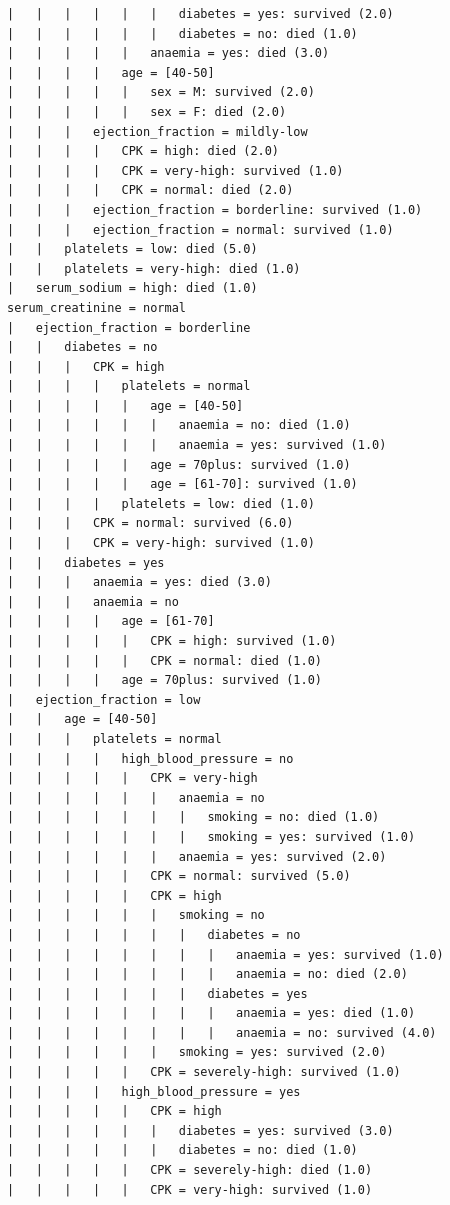 \documentclass[12pt,a4paper]{article}
\begin{document}
{\begin{verbatim}
|   |   |   |   |   |   diabetes = yes: survived (2.0)
|   |   |   |   |   |   diabetes = no: died (1.0)
|   |   |   |   |   anaemia = yes: died (3.0)
|   |   |   |   age = [40-50]
|   |   |   |   |   sex = M: survived (2.0)
|   |   |   |   |   sex = F: died (2.0)
|   |   |   ejection_fraction = mildly-low
|   |   |   |   CPK = high: died (2.0)
|   |   |   |   CPK = very-high: survived (1.0)
|   |   |   |   CPK = normal: died (2.0)
|   |   |   ejection_fraction = borderline: survived (1.0)
|   |   |   ejection_fraction = normal: survived (1.0)
|   |   platelets = low: died (5.0)
|   |   platelets = very-high: died (1.0)
|   serum_sodium = high: died (1.0)
serum_creatinine = normal
|   ejection_fraction = borderline
|   |   diabetes = no
|   |   |   CPK = high
|   |   |   |   platelets = normal
|   |   |   |   |   age = [40-50]
|   |   |   |   |   |   anaemia = no: died (1.0)
|   |   |   |   |   |   anaemia = yes: survived (1.0)
|   |   |   |   |   age = 70plus: survived (1.0)
|   |   |   |   |   age = [61-70]: survived (1.0)
|   |   |   |   platelets = low: died (1.0)
|   |   |   CPK = normal: survived (6.0)
|   |   |   CPK = very-high: survived (1.0)
|   |   diabetes = yes
|   |   |   anaemia = yes: died (3.0)
|   |   |   anaemia = no
|   |   |   |   age = [61-70]
|   |   |   |   |   CPK = high: survived (1.0)
|   |   |   |   |   CPK = normal: died (1.0)
|   |   |   |   age = 70plus: survived (1.0)
|   ejection_fraction = low
|   |   age = [40-50]
|   |   |   platelets = normal
|   |   |   |   high_blood_pressure = no
|   |   |   |   |   CPK = very-high
|   |   |   |   |   |   anaemia = no
|   |   |   |   |   |   |   smoking = no: died (1.0)
|   |   |   |   |   |   |   smoking = yes: survived (1.0)
|   |   |   |   |   |   anaemia = yes: survived (2.0)
|   |   |   |   |   CPK = normal: survived (5.0)
|   |   |   |   |   CPK = high
|   |   |   |   |   |   smoking = no
|   |   |   |   |   |   |   diabetes = no
|   |   |   |   |   |   |   |   anaemia = yes: survived (1.0)
|   |   |   |   |   |   |   |   anaemia = no: died (2.0)
|   |   |   |   |   |   |   diabetes = yes
|   |   |   |   |   |   |   |   anaemia = yes: died (1.0)
|   |   |   |   |   |   |   |   anaemia = no: survived (4.0)
|   |   |   |   |   |   smoking = yes: survived (2.0)
|   |   |   |   |   CPK = severely-high: survived (1.0)
|   |   |   |   high_blood_pressure = yes
|   |   |   |   |   CPK = high
|   |   |   |   |   |   diabetes = yes: survived (3.0)
|   |   |   |   |   |   diabetes = no: died (1.0)
|   |   |   |   |   CPK = severely-high: died (1.0)
|   |   |   |   |   CPK = very-high: survived (1.0)

\end{verbatim}}
\end{document}
